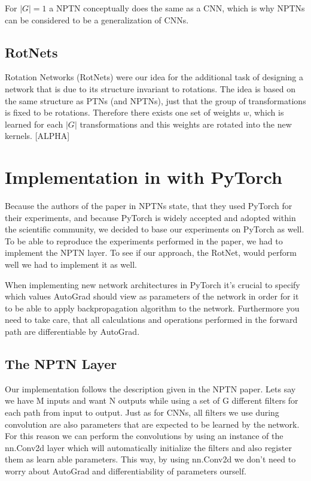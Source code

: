 \documentclass{llncs}
\begin{document}
For $|G|=1$ a NPTN conceptually does the same as a CNN, which is why NPTNs can be considered to be a generalization of CNNs. 


\subsection{RotNets}
Rotation Networks (RotNets) were our idea for the additional task of designing a network that is due to its structure invariant to rotations. 
The idea is based on the same structure as PTNs (and NPTNs), just that the group of transformations is fixed to be rotations. Therefore there exists one set of weights $w$, which is learned for each $|G|$ transformations and this weights are rotated into the new kernels. 
[ALPHA]

\section{Implementation in with PyTorch}
Because the authors of the paper in NPTNs state, that they used PyTorch for their experiments, and because PyTorch is widely accepted and adopted within the scientific community, we decided to base our experiments on PyTorch as well.
To be able to reproduce the experiments performed in the paper, we had to implement the NPTN layer. To see if our approach, the RotNet, would perform well we had to implement it as well.

When implementing new network architectures in PyTorch it's crucial to specify which values AutoGrad should view as parameters of the network in order for it to be able to apply backpropagation algorithm to the network. Furthermore you need to take care, that all calculations and operations performed in the forward path are differentiable by AutoGrad.
\subsection{The NPTN Layer}
Our implementation follows the description given in the NPTN paper.
Lets say we have M inputs and want N outputs while using a set of G different filters for each path from input to output.
Just as for CNNs, all filters we use during convolution are also parameters that are expected to be learned by the network.
For this reason we can perform the convolutions by using an instance of the nn.Conv2d layer which will automatically initialize the filters and also register them as learn able parameters. This way, by using nn.Conv2d we don't need to worry about AutoGrad and differentiability of parameters ourself.
\end{document}
